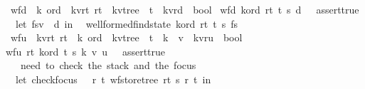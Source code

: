 \begin{isabellebody}
\isanewline
\isanewline
\isanewline
\isanewline
\isanewline
{}\isamarkupfalse%
\ wf{\isacharunderscore}d\ {\isacharcolon}{\isacharcolon}\ {\isachardoublequoteopen}{\isacharprime}k\ ord\ {\isasymRightarrow}\ {\isacharparenleft}{\isacharprime}k{\isacharcomma}{\isacharprime}v{\isacharcomma}{\isacharprime}r{\isacharcomma}{\isacharprime}t{\isacharparenright}\ r{}t\ {\isasymRightarrow}\ {\isacharparenleft}{\isacharprime}k{\isacharcomma}{\isacharprime}v{\isacharparenright}tree\ {\isasymRightarrow}\ {\isacharprime}t\ {\isasymRightarrow}\ {\isacharparenleft}{\isacharprime}k{\isacharcomma}{\isacharprime}v{\isacharcomma}{\isacharprime}r{\isacharparenright}d\ {\isasymRightarrow}\ bool{\isachardoublequoteclose}\ \isanewline
{\isachardoublequoteopen}wf{\isacharunderscore}d\ k{\isacharunderscore}ord\ r{}t\ t{}\ s\ d\ {\isacharequal}\ \ assert{\isacharunderscore}true\ {\isacharparenleft}\isanewline
\ \ let\ {\isacharparenleft}fs{\isacharcomma}v{\isacharparenright}\ {\isacharequal}\ d\ in\isanewline
\ \ wellformed{\isacharunderscore}find{\isacharunderscore}state\ k{\isacharunderscore}ord\ r{}t\ t{}\ s\ fs{\isacharparenright}{\isachardoublequoteclose}\isanewline
\isanewline
\isanewline
{}\isamarkupfalse%
\ wf{\isacharunderscore}u\ {\isacharcolon}{\isacharcolon}\ {\isachardoublequoteopen}{\isacharparenleft}{\isacharprime}k{\isacharcomma}{\isacharprime}v{\isacharcomma}{\isacharprime}r{\isacharcomma}{\isacharprime}t{\isacharparenright}\ r{}t\ {\isasymRightarrow}\ {\isacharprime}k\ ord\ {\isasymRightarrow}\ {\isacharparenleft}{\isacharprime}k{\isacharcomma}{\isacharprime}v{\isacharparenright}tree\ {\isasymRightarrow}\ {\isacharprime}t\ {\isasymRightarrow}\ {\isacharprime}k\ {\isasymRightarrow}\ {\isacharprime}v\ {\isasymRightarrow}\ {\isacharparenleft}{\isacharprime}k{\isacharcomma}{\isacharprime}v{\isacharcomma}{\isacharprime}r{\isacharparenright}u\ {\isasymRightarrow}\ bool{\isachardoublequoteclose}\ \isanewline
{\isachardoublequoteopen}wf{\isacharunderscore}u\ r{}t\ k{\isacharunderscore}ord\ t{}\ s\ k\ v\ u\ {\isacharequal}\ \ assert{\isacharunderscore}true\ {\isacharparenleft}\isanewline
\ \ {\isacharparenleft}{\isacharasterisk}\ need\ to\ check\ the\ stack\ and\ the\ focus\ {\isacharasterisk}{\isacharparenright}\isanewline
\ \ let\ check{\isacharunderscore}focus\ {\isacharequal}\ {\isacharpercent}\ r\ t{\isachardot}\ wf{\isacharunderscore}store{\isacharunderscore}tree\ r{}t\ s\ r\ t\ in\isanewline

\end{isabellebody}
